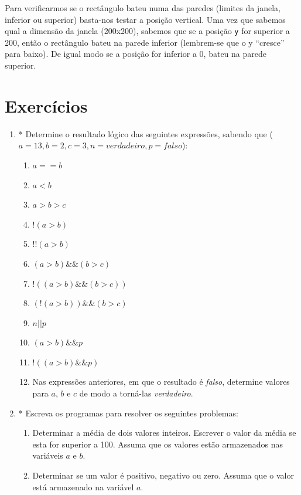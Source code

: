 Para verificarmos se o rectângulo bateu numa das paredes (limites da janela, inferior ou superior) basta-nos testar a posição vertical. Uma vez que sabemos qual a dimensão da janela (200x200), sabemos que se a posição \texttt{y} for superior a 200, então o rectângulo bateu na parede inferior (lembrem-se que o y ``cresce'' para baixo). De igual modo se a posição for inferior a 0, bateu na parede superior.



\section{Exercícios}
\begin{enumerate}
	
	\item \label{exe_4_operadores} 
	* Determine o resultado lógico das seguintes expressões, sabendo que ($a = 13, b = 2, c = 3, n = verdadeiro, p = falso$):
\begin{enumerate}
\item $a == b$ 
\item $a < b$
\item $a > b > c$
\item $!(a > b)$
\item $! !(a > b)$
\item $(a > b) \&\& (b > c)$
\item $!((a > b) \&\& (b > c))$
\item $(!(a > b)) \&\& (b > c)$
\item $n || p$
\item $(a>b) \&\& p$
\item $!((a>b) \&\& p)$\item Nas expressões anteriores, em que o resultado é \emph{falso}, determine valores para $a$, $b$ e $c$ de
modo a torná-las \emph{verdadeiro}.
\end{enumerate}

\item \label{exe_4_fluxo}
* Escreva os programas para resolver os seguintes problemas:
\begin{enumerate}

\item Determinar a média de dois valores inteiros. Escrever o valor da média
se esta for superior a 100. Assuma que os valores estão armazenados nas variáveis $a$ e $b$.

\item Determinar se um valor é positivo, negativo ou zero. Assuma que o valor está armazenado na variável $a$.


\end{enumerate}
\end{enumerate}
